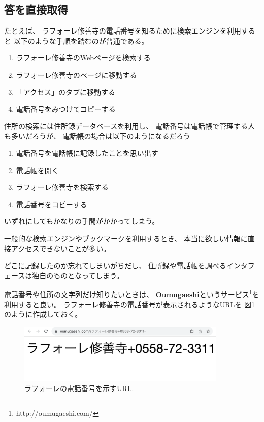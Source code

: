 \documentclass{ipsjprosym}
\begin{document}
\subsection{答を直接取得}

たとえば、
ラフォーレ修善寺の電話番号を知るために検索エンジンを利用すると
以下のような手順を踏むのが普通である。

\vspace{2mm}

\begin{enumerate}
\item ラフォーレ修善寺のWebページを検索する
\item ラフォーレ修善寺のページに移動する
\item 「アクセス」のタブに移動する
\item 電話番号をみつけてコピーする
\end{enumerate}

\vspace{3mm}

住所の検索には住所録データベースを利用し、
電話番号は電話帳で管理する人も多いだろうが、
電話帳の場合は以下のようになるだろう

\vspace{2mm}

\begin{enumerate}
\item 電話番号を電話帳に記録したことを思い出す
\item 電話帳を開く
\item ラフォーレ修善寺を検索する
\item 電話番号をコピーする
\end{enumerate}

\vspace{3mm}
\noindent
いずれにしてもかなりの手間がかかってしまう。

一般的な検索エンジンやブックマークを利用するとき、
本当に欲しい情報に直接アクセスできないことが多い。

どこに記録したのか忘れてしまいがちだし、
住所録や電話帳を調べるインタフェースは独自のものとなってしまう。

電話番号や住所の文字列だけ知りたいときは、
\textbf{Oumugaeshi}というサービス\footnote{
  \textsf{http://oumugaeshi.com/}
}を利用すると良い。
ラフォーレ修善寺の電話番号が表示されるようなURLを
図\ref{tel}のように作成しておく。

\begin{figure}[h]
  \includegraphics[width=10cm,bb=0 0 1514 434]{figures/41af781b930c1e4594ad53bdf429b4e9.png}
  \caption{ラフォーレの電話番号を示すURL.}
  \label{tel}
\end{figure}
\end{document}
